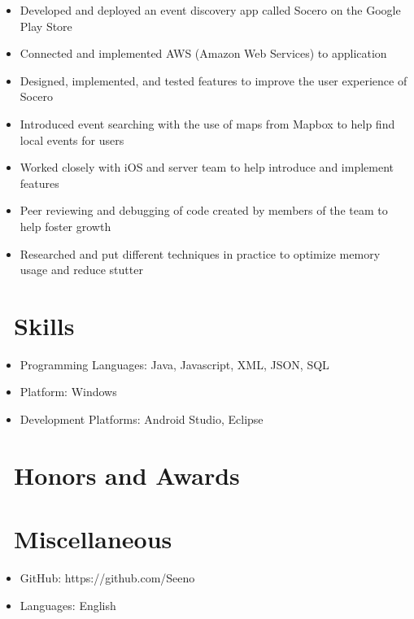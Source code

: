 \documentclass{resume}
\begin{document}
\begin{itemize}
  \item Developed and deployed an event discovery app called Socero on the Google Play Store 
  \item Connected and implemented AWS (Amazon Web Services) to application
  \item Designed, implemented, and tested features to improve the user experience of Socero
  \item Introduced event searching with the use of maps from Mapbox to help find local events for users
  \item Worked closely with iOS and server team to help introduce and implement features
  \item Peer reviewing and debugging of code created by members of the team to help foster growth
  \item Researched and put different techniques in practice to optimize memory usage and reduce stutter
\end{itemize}


\section{\faCogs\ Skills}
\begin{itemize}[parsep=0.5ex]
  \item Programming Languages: Java, Javascript, XML, JSON, SQL
  \item Platform: Windows
  \item Development Platforms: Android Studio, Eclipse
\end{itemize}

\section{\faHeartO\ Honors and Awards}

\section{\faInfo\ Miscellaneous}
\begin{itemize}[parsep=0.5ex]
  \item GitHub: https://github.com/Seeno
  \item Languages: English
\end{itemize}

%
%
\end{document}
